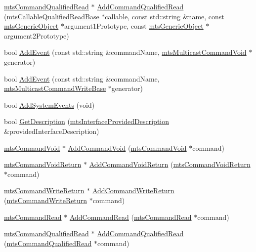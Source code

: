 \begin{DoxyCompactItemize}
\item 
\hyperlink{classmts_command_qualified_read}{mts\+Command\+Qualified\+Read} $\ast$ \hyperlink{classmts_interface_provided_a8c75f78b80489039839ac45ba152acf6}{Add\+Command\+Qualified\+Read} (\hyperlink{classmts_callable_qualified_read_base}{mts\+Callable\+Qualified\+Read\+Base} $\ast$callable, const std\+::string \&name, const \hyperlink{classmts_generic_object}{mts\+Generic\+Object} $\ast$argument1\+Prototype, const \hyperlink{classmts_generic_object}{mts\+Generic\+Object} $\ast$argument2\+Prototype)
\item 
bool \hyperlink{classmts_interface_provided_ac10644a4bff7c746528c4442dab69b64}{Add\+Event} (const std\+::string \&command\+Name, \hyperlink{classmts_multicast_command_void}{mts\+Multicast\+Command\+Void} $\ast$generator)
\item 
bool \hyperlink{classmts_interface_provided_abeaef52139a77f3100bf9f437a24acc1}{Add\+Event} (const std\+::string \&command\+Name, \hyperlink{classmts_multicast_command_write_base}{mts\+Multicast\+Command\+Write\+Base} $\ast$generator)
\item 
bool \hyperlink{classmts_interface_provided_aea73142d6bfe70f30be9ef051c3ac754}{Add\+System\+Events} (void)
\item 
bool \hyperlink{classmts_interface_provided_ab6c844e481cf4e5e6ba59e1c61341f4e}{Get\+Description} (\hyperlink{classmts_interface_provided_description}{mts\+Interface\+Provided\+Description} \&provided\+Interface\+Description)
\end{DoxyCompactItemize}
{\bf }\par
\begin{DoxyCompactItemize}
\item 
\hyperlink{classmts_command_void}{mts\+Command\+Void} $\ast$ \hyperlink{classmts_interface_provided_a411ee94b6d040a454f335621cc66ba50}{Add\+Command\+Void} (\hyperlink{classmts_command_void}{mts\+Command\+Void} $\ast$command)
\item 
\hyperlink{classmts_command_void_return}{mts\+Command\+Void\+Return} $\ast$ \hyperlink{classmts_interface_provided_a8f3e25f5f8c61db7375f0a88dca6d8fe}{Add\+Command\+Void\+Return} (\hyperlink{classmts_command_void_return}{mts\+Command\+Void\+Return} $\ast$command)
\item 
\hyperlink{classmts_command_write_return}{mts\+Command\+Write\+Return} $\ast$ \hyperlink{classmts_interface_provided_a1ce140f4fdc8cf6051f5a40c2dd631db}{Add\+Command\+Write\+Return} (\hyperlink{classmts_command_write_return}{mts\+Command\+Write\+Return} $\ast$command)
\item 
\hyperlink{classmts_command_read}{mts\+Command\+Read} $\ast$ \hyperlink{classmts_interface_provided_a58cd0b600035f04a7b9913d32e2dc20c}{Add\+Command\+Read} (\hyperlink{classmts_command_read}{mts\+Command\+Read} $\ast$command)
\item 
\hyperlink{classmts_command_qualified_read}{mts\+Command\+Qualified\+Read} $\ast$ \hyperlink{classmts_interface_provided_aaf37a3985a0b02afcbcff20a2e942161}{Add\+Command\+Qualified\+Read} (\hyperlink{classmts_command_qualified_read}{mts\+Command\+Qualified\+Read} $\ast$command)
\end{DoxyCompactItemize}

